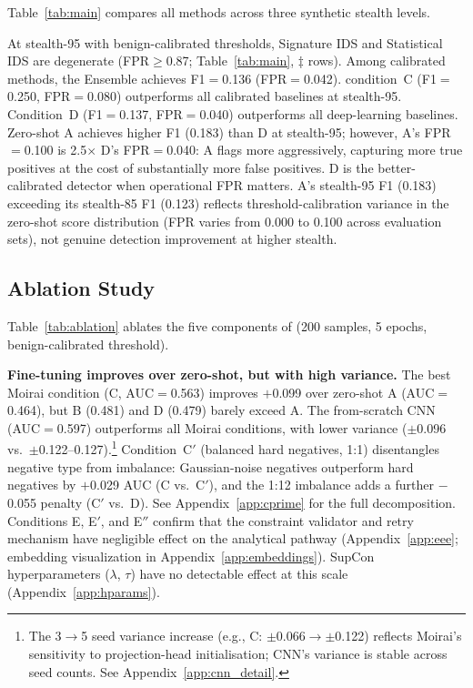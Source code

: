 Table~\ref{tab:main} compares all methods across three synthetic stealth levels.



At stealth-95 with benign-calibrated thresholds, Signature IDS and
Statistical IDS are degenerate (FPR$\geq$0.87; Table~\ref{tab:main},
$\ddagger$ rows).  Among calibrated methods, the Ensemble achieves
F1$=$0.136 (FPR$=$0.042).
\ours{} condition~C (F1$=$0.250, FPR$=$0.080) outperforms all calibrated
baselines at stealth-95.
Condition~D (F1$=$0.137, FPR$=$0.040) outperforms all deep-learning baselines.
Zero-shot A achieves higher F1 (0.183) than D at stealth-95; however,
A's FPR$=$0.100 is 2.5$\times$ D's FPR$=$0.040: A flags more aggressively,
capturing more true positives at the cost of substantially more false positives.
D is the better-calibrated detector when operational FPR matters.
A's stealth-95 F1 (0.183) exceeding its stealth-85 F1 (0.123) reflects
threshold-calibration variance in the zero-shot score distribution
(FPR varies from 0.000 to 0.100 across evaluation sets), not genuine
detection improvement at higher stealth.

\subsection{Ablation Study}
\label{sec:experiments:ablation}

Table~\ref{tab:ablation} ablates the five components of \ours{} (200
samples, 5 epochs, benign-calibrated threshold).



\textbf{Fine-tuning improves over zero-shot, but with high variance.}
The best Moirai condition (C, AUC$=$0.563) improves $+$0.099 over
zero-shot A (AUC$=$0.464), but B (0.481) and D (0.479) barely exceed A.
The from-scratch CNN (AUC$=$0.597) outperforms all Moirai conditions,
with lower variance ($\pm$0.096 vs.\ $\pm$0.122--0.127).\footnote{%
  The 3$\to$5 seed variance increase (e.g., C: $\pm$0.066$\to$$\pm$0.122)
  reflects Moirai's sensitivity to projection-head initialisation;
  CNN's variance is stable across seed counts.  See Appendix~\ref{app:cnn_detail}.}
Condition~C$'$ (balanced hard negatives, 1:1) disentangles negative type from
imbalance: Gaussian-noise negatives outperform hard negatives by $+$0.029 AUC
(C vs.\ C$'$), and the 1:12 imbalance adds a further $-$0.055 penalty (C$'$ vs.\ D).
See Appendix~\ref{app:cprime} for the full decomposition.
Conditions E, E$'$, and E$''$ confirm that the constraint validator and
retry mechanism have negligible effect on the analytical pathway
(Appendix~\ref{app:eee}; embedding visualization in Appendix~\ref{app:embeddings}).
SupCon hyperparameters ($\lambda$, $\tau$) have no detectable effect at
this scale (Appendix~\ref{app:hparams}).

